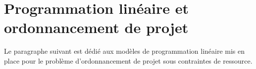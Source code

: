 \chapter{Programmation linéaire et ordonnancement
  de projet}



Le paragraphe suivant est dédié aux modèles de programmation linéaire
mis en place pour le problème d'ordonnancement de projet sous
contraintes de ressource. 




